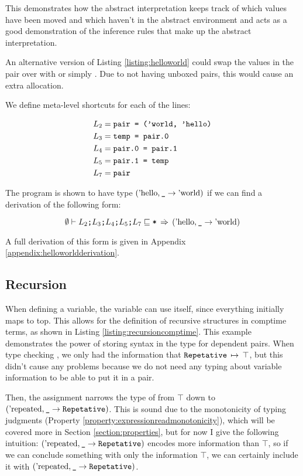 \documentclass[12pt,twoside]{report}
\begin{document}
This demonstrates how the abstract interpretation keeps track of which values have been moved and which haven't in the abstract environment and acts as a good demonstration of the inference rules that make up the abstract interpretation.

An alternative version of Listing \ref{listing:helloworld} could swap the values in the pair over with  or simply . Due to not having unboxed pairs, this would cause an extra allocation.

We define meta-level shortcuts for each of the lines:

\[\begin{aligned}
L_2 &= \text{\texttt{pair = ('world, 'hello)}} \\
L_3 &= \text{\texttt{temp = pair.0}} \\
L_4 &= \text{\texttt{pair.0 = pair.1}} \\
L_5 &= \text{\texttt{pair.1 = temp}} \\
L_7 &= \text{\texttt{pair}} \\
\end{aligned}\]

The program is shown to have type $(\text{'hello}, \text{\texttt{\_}} \rightarrow \text{'world})$ if we can find a derivation of the following form:

\[
\emptyset \vdash L_2\text{\texttt{;}}L_3\text{\texttt{;}}L_4\text{\texttt{;}}L_5\text{\texttt{;}}L_7 \sqsubseteq \text{\texttt{*}} \,\stackrel{.}{\Rightarrow}\, (\text{'hello}, \text{\texttt{\_}} \rightarrow \text{'world})
\]

A full derivation of this form is given in Appendix  \ref{appendix:helloworldderivation}.

\subsection{Recursion}
When defining a variable, the variable can use itself, since everything initially maps to top. This allows for the definition of recursive structures in comptime terms, as shown in Listing \ref{listing:recursioncomptime}. This example demonstrates the power of storing syntax in the type for dependent pairs. When type checking , we only had the information that $\text{\texttt{Repetative}} \, \mapsto \, \top$, but this didn't cause any problems because we do not need any typing about variable information to be able to put it in a pair.

Then, the assignment narrows the type of  from $\top$ down to $(\text{'repeated}, \text{\texttt{\_}} \rightarrow \text{\texttt{Repetative}})$. This is sound due to the monotonicity of typing judgments (Property \ref{property:expressionreadmonotonicity}), which will be covered more in Section \ref{section:properties}, but for now I give the following intuition: $(\text{'repeated}, \text{\texttt{\_}} \rightarrow \text{\texttt{Repetative}})$ encodes more information than $\top$, so if we can conclude something with only the information $\top$, we can certainly include it with $(\text{'repeated}, \text{\texttt{\_}} \rightarrow \text{\texttt{Repetative}})$.
\end{document}
